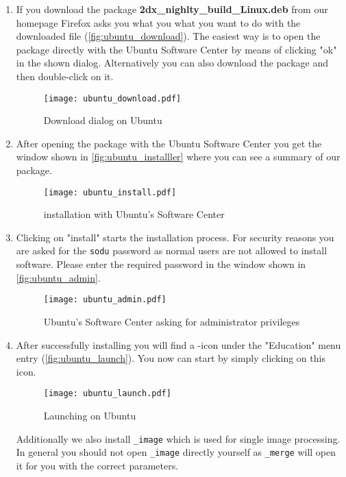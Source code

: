 \begin{enumerate}
	\item If you download the package \textbf{2dx\_nighlty\_build\_Linux.deb} from our homepage Firefox asks you what you what you want to do with the downloaded file (\autoref{fig:ubuntu_download}). The easiest way is to open the package directly with the Ubuntu Software Center by means of clicking "ok" in the shown dialog. Alternatively you can also download the package and then double-click on it.

	\begin{figure}[H]
		\centering
		\texttt{[image: ubuntu\_download.pdf]}
		\caption{Download dialog on Ubuntu}
		\label{fig:ubuntu_download}
	\end{figure}
	
	\item After opening the package with the Ubuntu Software Center you get the window shown in \autoref{fig:ubuntu_installler} where you can see a summary of our package.
	
	\begin{figure}[H]
		\centering
		\texttt{[image: ubuntu\_install.pdf]}
		\caption{{\twodx} installation with Ubuntu's Software Center}
		\label{fig:ubuntu_installler}
	\end{figure}
	
	\item Clicking on "install" starts the installation process. For security reasons you are asked for the \texttt{sodu} password as normal users are not allowed to install software. Please enter the required password in the window shown in \autoref{fig:ubuntu_admin}.
	
	\begin{figure}[H]
		\centering
		\texttt{[image: ubuntu\_admin.pdf]}
		\caption{Ubuntu's Software Center asking for administrator privileges}
		\label{fig:ubuntu_admin}
	\end{figure}
	
	\item After successfully installing {\twodx} you will find a {\twodx}-icon under the "Education" menu entry (\autoref{fig:ubuntu_launch}). You now can start {\twodx} by simply clicking on this icon. 
	
	\begin{figure}[H]
		\centering
		\texttt{[image: ubuntu\_launch.pdf]}
		\caption{Launching {\twodx} on Ubuntu}
		\label{fig:ubuntu_launch}
	\end{figure}
	
	Additionally we also install {\twodx}\texttt{\_image} which is used for single image processing. In general you should not open {\twodx}\texttt{\_image} directly yourself as {\twodx}\texttt{\_merge} will open it for you with the correct parameters.

\end{enumerate}

